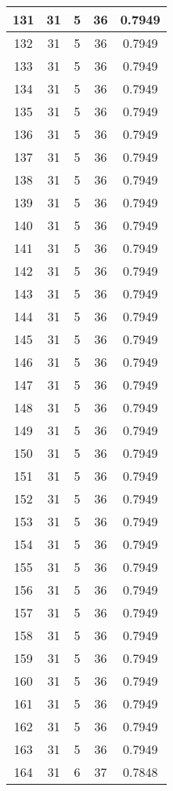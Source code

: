 \documentclass[letterpaper, 12pt]{article}
\begin{document}
\begin{longtable}{|c|c|c|c|c|}
\hline
131 & 31 & 5 & 36 & 0.7949 \\
\hline
132 & 31 & 5 & 36 & 0.7949 \\
\hline
133 & 31 & 5 & 36 & 0.7949 \\
\hline
134 & 31 & 5 & 36 & 0.7949 \\
\hline
135 & 31 & 5 & 36 & 0.7949 \\
\hline
136 & 31 & 5 & 36 & 0.7949 \\
\hline
137 & 31 & 5 & 36 & 0.7949 \\
\hline
138 & 31 & 5 & 36 & 0.7949 \\
\hline
139 & 31 & 5 & 36 & 0.7949 \\
\hline
140 & 31 & 5 & 36 & 0.7949 \\
\hline
141 & 31 & 5 & 36 & 0.7949 \\
\hline
142 & 31 & 5 & 36 & 0.7949 \\
\hline
143 & 31 & 5 & 36 & 0.7949 \\
\hline
144 & 31 & 5 & 36 & 0.7949 \\
\hline
145 & 31 & 5 & 36 & 0.7949 \\
\hline
146 & 31 & 5 & 36 & 0.7949 \\
\hline
147 & 31 & 5 & 36 & 0.7949 \\
\hline
148 & 31 & 5 & 36 & 0.7949 \\
\hline
149 & 31 & 5 & 36 & 0.7949 \\
\hline
150 & 31 & 5 & 36 & 0.7949 \\
\hline
151 & 31 & 5 & 36 & 0.7949 \\
\hline
152 & 31 & 5 & 36 & 0.7949 \\
\hline
153 & 31 & 5 & 36 & 0.7949 \\
\hline
154 & 31 & 5 & 36 & 0.7949 \\
\hline
155 & 31 & 5 & 36 & 0.7949 \\
\hline
156 & 31 & 5 & 36 & 0.7949 \\
\hline
157 & 31 & 5 & 36 & 0.7949 \\
\hline
158 & 31 & 5 & 36 & 0.7949 \\
\hline
159 & 31 & 5 & 36 & 0.7949 \\
\hline
160 & 31 & 5 & 36 & 0.7949 \\
\hline
161 & 31 & 5 & 36 & 0.7949 \\
\hline
162 & 31 & 5 & 36 & 0.7949 \\
\hline
163 & 31 & 5 & 36 & 0.7949 \\
\hline
164 & 31 & 6 & 37 & 0.7848 \\

\end{longtable}
\end{document}
